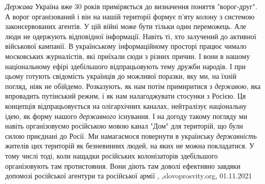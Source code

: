 \emph{Держава} Україна вже 30 років приміряється до визначення поняття
"ворог-друг". А ворог організований і він на нашій території формує п’яту
колону з системою законсервованих агентів. У цій війні може бути тільки один
переможець. Але люди не одержують відповідної інформації. Навіть ті, хто
залучений до активної військової кампанії.  В українському інформаційному
просторі працює чимало московських журналістів, які приїхали сюди з різних
причин. І вони в нашому національному ефірі здебільшого відпрацьовують тему
дружби народів. І при цьому готують свідомість українців до можливої поразки,
яку ми, на їхній погляд, ніяк не обійдемо. Розказують, як нам потім примиритися
з \emph{державою}, яка впровадить путінський режим, і як нам налагоджувати
стосунки з Росією. Ця концепція відпрацьовується на олігархічних каналах,
нейтралізує національну ідею, як форму нашого \emph{державного} існування. І на
догоду такому погляду ми навіть організовуємо російською мовою канал "Дом" для
територій, що були силою приєднані до Росії. Ми намагаємося повернути в
українську \emph{державність} жителів цих територій як безневинних людей, на
яких не можна покладатися. У тому числі тоді, коли нащадки російських
колонізаторів здебільшого організовують там протистояння. Вони діють там доволі
ефективно завдяки допомозі російської агентури та російської армії
, ,slovoprosvity.org, 01.11.2021
